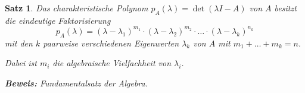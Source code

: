 \documentclass[%
a4paper,
11pt,		%
leqno,		%
]
{scrartcl}
\theoremstyle{plain}
\theoremstyle{plain}
\newtheorem{mysatz}[mydef]{Satz}
\begin{document}
\begin{mysatz}
Das charakteristische Polynom $p_A(\lambda) = \det(\lambda I - A)$ von $A$ besitzt die eindeutige Faktorisierung
\[
p_A(\lambda) = (\lambda - \lambda_1)^{m_1} \cdot (\lambda - \lambda_2)^{m_2} \cdot \ldots \cdot (\lambda - \lambda_k)^{n_k}
\]
mit den $k$ paarweise verschiedenen Eigenwerten $\lambda_k$ von $A$ mit $m_1 + \ldots + m_k = n$.

Dabei ist $m_i$ die algebraische Vielfachheit von $\lambda_i$.\newline

\textbf{Beweis:} Fundamentalsatz der Algebra.
\end{mysatz}



 
\end{document}
